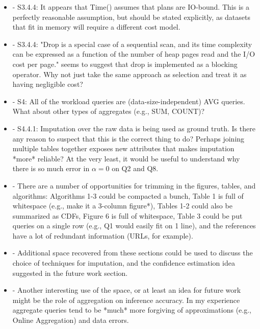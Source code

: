\documentclass[draft,12pt]{article}
\newcommand{\resp}[1]{{\color{blue}{#1}}}
\begin{document}
\begin{itemize}
\item - S3.4.4: It appears that Time() assumes that plans are IO-bound. This is a perfectly reasonable assumption, but should be stated explicitly, as datasets that fit in memory will require a different cost model.

  \resp{Agreed. Our database stores tables in files, so our plans are I/O bound, but a database which uses an in-memory representation will need a different Time() function.}

\item - S3.4.4: "Drop is a special case of a sequential scan, and its time complexity can be expressed as a function of the number of heap pages read and the I/O cost per page." seems to suggest that drop is implemented as a blocking operator. Why not just take the same approach as selection and treat it as having negligible cost?

\item - S4: All of the workload queries are (data-size-independent) AVG queries. What about other types of aggregates (e.g., SUM, COUNT)?

\item - S4.4.1: Imputation over the raw data is being used as ground truth. Is there any reason to suspect that this is the correct thing to do? Perhaps joining multiple tables together exposes new attributes that makes imputation *more* reliable? At the very least, it would be useful to understand why there is so much error in $\alpha=0$ on Q2 and Q8.

\item - There are a number of opportunities for trimming in the figures, tables, and algorithms: Algorithms 1-3 could be compacted a bunch, Table 1 is full of whitespace (e.g., make it a 3-column {figure*}), Tables 1-2 could also be summarized as CDFs, Figure 6 is full of whitespace, Table 3 could be put queries on a single row (e.g., Q1 would easily fit on 1 line), and the references have a lot of redundant information (URLs, for example). 

\item - Additional space recovered from these sections could be used to discuss the choice of techniques for imputation, and the confidence estimation idea suggested in the future work section. 

\item - Another interesting use of the space, or at least an idea for future work might be the role of aggregation on inference accuracy. In my experience aggregate queries tend to be *much* more forgiving of approximations (e.g., Online Aggregation) and data errors.
\end{itemize}
\end{document}
